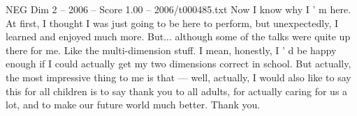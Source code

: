 \begin{textsample}{NEG Dim 2 – 2006 – Score 1.00 – 2006/t000485.txt}
Now I know why I ' m here.
At first, I thought I was just going to be here to perform, but unexpectedly, I learned and enjoyed much more.
But... although some of the talks were quite up there for me.
Like the multi-dimension stuff.
I mean, honestly, I ' d be happy enough if I could actually get my two dimensions correct in school.
But actually, the most impressive thing to me is that — well, actually, I would also like to say this for all children is to say thank you to all adults, for actually caring for us a lot, and to make our future world much better.
Thank you.

\end{textsample}
